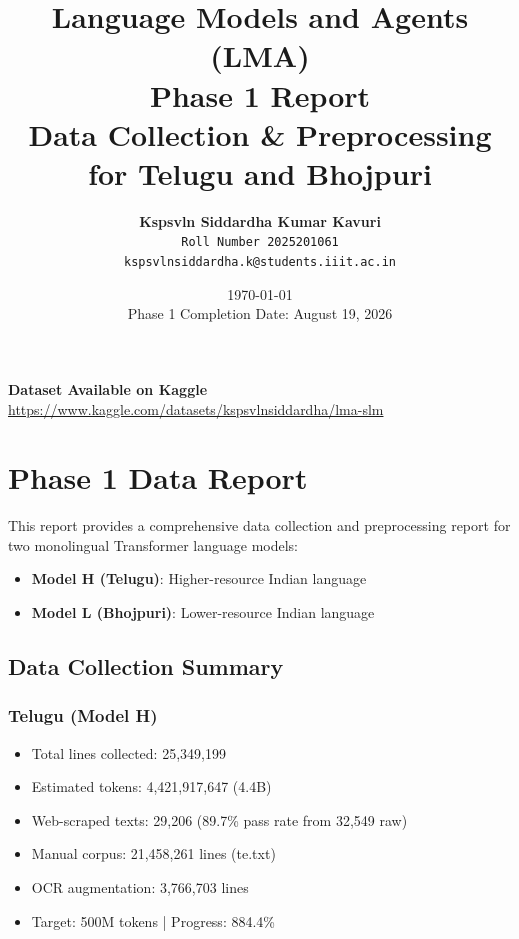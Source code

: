 \documentclass[11pt,a4paper]{article}
\title{
    \textbf{Language Models and Agents (LMA)\\[0.3cm] Phase 1 Report}\\[0.3cm]
    \Large Data Collection \& Preprocessing for Telugu and Bhojpuri
}
\author{
    \textbf{Kspsvln Siddardha Kumar Kavuri}\\
    \texttt{Roll Number 2025201061} \\
    \texttt{kspsvlnsiddardha.k@students.iiit.ac.in}
}
\date{
    \today\\
    \small{Phase 1 Completion Date: August 19, 2026}
}
\begin{document}
\maketitle
\thispagestyle{fancy}

\begin{center}
    \textbf{\Large Dataset Available on Kaggle}\\[0.2cm]
    \url{https://www.kaggle.com/datasets/kspsvlnsiddardha/lma-slm}
\end{center}

\tableofcontents
\newpage

\section{Phase 1 Data Report}

This report provides a comprehensive data collection and preprocessing report for two monolingual Transformer language models:

\begin{itemize}
    \item \textbf{Model H (Telugu)}: Higher-resource Indian language
    \item \textbf{Model L (Bhojpuri)}: Lower-resource Indian language
\end{itemize}

\subsection{Data Collection Summary}

\subsubsection{Telugu (Model H)}
\begin{itemize}
    \item Total lines collected: 25,349,199
    \item Estimated tokens: 4,421,917,647 (4.4B)
    \item Web-scraped texts: 29,206 (89.7\% pass rate from 32,549 raw)
    \item Manual corpus: 21,458,261 lines (te.txt)
    \item OCR augmentation: 3,766,703 lines
    \item Target: 500M tokens | Progress: 884.4\%
\end{itemize}
\end{document}
